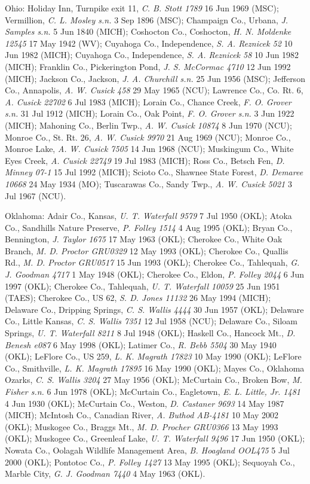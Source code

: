 \documentclass{article}
\begin{document}
Ohio:
Holiday Inn, Turnpike exit 11, \textit{C. B. Stott 1789} 16 Jun 1969 (MSC);
Vermillion, \textit{C. L. Mosley s.n.} 3 Sep 1896 (MSC);
Champaign Co., Urbana, \textit{J. Samples s.n.} 5 Jun 1840 (MICH);
Coshocton Co., Coshocton, \textit{H. N. Moldenke 12545} 17 May 1942 (WV);
Cuyahoga Co., Independence, \textit{S. A. Reznicek 52} 10 Jun 1982 (MICH);
Cuyahoga Co., Independence, \textit{S. A. Reznicek 58} 10 Jun 1982 (MICH);
Franklin Co., Pickerington Pond, \textit{J. S. McCormac 4710} 12 Jun 1992 (MICH);
Jackson Co., Jackson, \textit{J. A. Churchill s.n.} 25 Jun 1956 (MSC);
Jefferson Co., Annapolis, \textit{A. W. Cusick 458} 29 May 1965 (NCU);
Lawrence Co., Co. Rt. 6, \textit{A. Cusick 22702} 6 Jul 1983 (MICH);
Lorain Co., Chance Creek, \textit{F. O. Grover s.n.} 31 Jul 1912 (MICH);
Lorain Co., Oak Point, \textit{F. O. Grover s.n.} 3 Jun 1922 (MICH);
Mahoning Co., Berlin Twp., \textit{A. W. Cusick 10874} 8 Jun 1970 (NCU);
Monroe Co., St. Rt. 26, \textit{A. W. Cusick 9970} 21 Aug 1969 (NCU);
Monroe Co., Monroe Lake, \textit{A. W. Cusick 7505} 14 Jun 1968 (NCU);
Muskingum Co., White Eyes Creek, \textit{A. Cusick 22749} 19 Jul 1983 (MICH);
Ross Co., Betsch Fen, \textit{D. Minney 07-1} 15 Jul 1992 (MICH);
Scioto Co., Shawnee State Forest, \textit{D. Demaree 10668} 24 May 1934 (MO);
Tuscarawas Co., Sandy Twp., \textit{A. W. Cusick 5021} 3 Jul 1967 (NCU).

Oklahoma:
Adair Co., Kansas, \textit{U. T. Waterfall 9579} 7 Jul 1950 (OKL);
Atoka Co., Sandhills Nature Preserve, \textit{P. Folley 1514} 4 Aug 1995 (OKL);
Bryan Co., Bennington, \textit{J. Taylor 1675} 17 May 1963 (OKL);
Cherokee Co., White Oak Branch, \textit{M. D. Proctor GRU0329} 12 May 1993 (OKL);
Cherokee Co., Quallis Rd., \textit{M. D. Proctor GRU0517} 15 Jun 1993 (OKL);
Cherokee Co., Tahlequah, \textit{G. J. Goodman 4717} 1 May 1948 (OKL);
Cherokee Co., Eldon, \textit{P. Folley 2044} 6 Jun 1997 (OKL);
Cherokee Co., Tahlequah, \textit{U. T. Waterfall 10059} 25 Jun 1951 (TAES);
Cherokee Co., US 62, \textit{S. D. Jones 11132} 26 May 1994 (MICH);
Delaware Co., Dripping Springs, \textit{C. S. Wallis 4444} 30 Jun 1957 (OKL);
Delaware Co., Little Kansas, \textit{C. S. Wallis 7351} 12 Jul 1958 (NCU);
Delaware Co., Siloam Springs, \textit{U. T. Waterfall 8211} 8 Jul 1948 (OKL);
Haskell Co., Hancock Mt., \textit{D. Benesh e087} 6 May 1998 (OKL);
Latimer Co., \textit{R. Bebb 5504} 30 May 1940 (OKL);
LeFlore Co., US 259, \textit{L. K. Magrath 17823} 10 May 1990 (OKL);
LeFlore Co., Smithville, \textit{L. K. Magrath 17895} 16 May 1990 (OKL);
Mayes Co., Oklahoma Ozarks, \textit{C. S. Wallis 3204} 27 May 1956 (OKL);
McCurtain Co., Broken Bow, \textit{M. Fisher s.n.} 6 Jun 1978 (OKL);
McCurtain Co., Eagletown, \textit{E. L. Little, Jr. 1481} 4 Jun 1930 (OKL);
McCurtain Co., Weston, \textit{D. Castaner 9693} 14 May 1987 (MICH);
McIntosh Co., Canadian River, \textit{A. Buthod AB-4181} 10 May 2002 (OKL);
Muskogee Co., Braggs Mt., \textit{M. D. Procher GRU0366} 13 May 1993 (OKL);
Muskogee Co., Greenleaf Lake, \textit{U. T. Waterfall 9496} 17 Jun 1950 (OKL);
Nowata Co., Oolagah Wildlife Management Area, \textit{B. Hoagland OOL475} 5 Jul 2000 (OKL);
Pontotoc Co., \textit{P. Folley 1427} 13 May 1995 (OKL);
Sequoyah Co., Marble City, \textit{G. J. Goodman 7440} 4 May 1963 (OKL).
\end{document}
